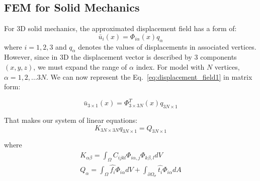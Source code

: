 \documentclass[en]{minipw} %
\begin{document}
\subsection{FEM for Solid Mechanics}
For 3D solid mechanics, the approximated displacement field has a form of:
\begin{equation}
\label{eq:displacement_field1}
\bar{u}_{i}(x) = \Phi_{i \alpha}(x)q_{\alpha}
\end{equation}
where $i = 1,2,3$ and $q_{\alpha}$ denotes the values of displacements in associated vertices. However, since in 3D the displacement vector is described by 3 components$(x,y,z)$, we must expand the range of $\alpha$ index. For model with $N$ vertices, $\alpha = 1,2,...3N$. We can now represent the Eq.~\ref{eq:displacement_field1} in matrix form:

\begin{equation}
\label{eq:displacement_field1}
\bar{u}_{3 \times 1}(x) = \Phi^{T}_{3 \times 3N}(x)q_{3N \times 1}
\end{equation}

That makes our system of linear equations:
\begin{equation}
K_{3N \times 3N} q_{3N \times 1} = Q_{3N \times 1}
\end{equation}

where
\begin{equation}
\begin{aligned}
K_{\alpha \beta} = \int_{\Omega} C_{ijkl} \Phi_{i \alpha,j} \Phi_{k \beta,l} dV 
\\
Q_{\alpha} = \int_{\Omega} \hat{f_i} \Phi_{i \alpha} dV + \int_{\partial \Omega_{\sigma}} \hat{t_i}\Phi_{i \alpha} dA
\end{aligned}
\end{equation}
\end{document}
